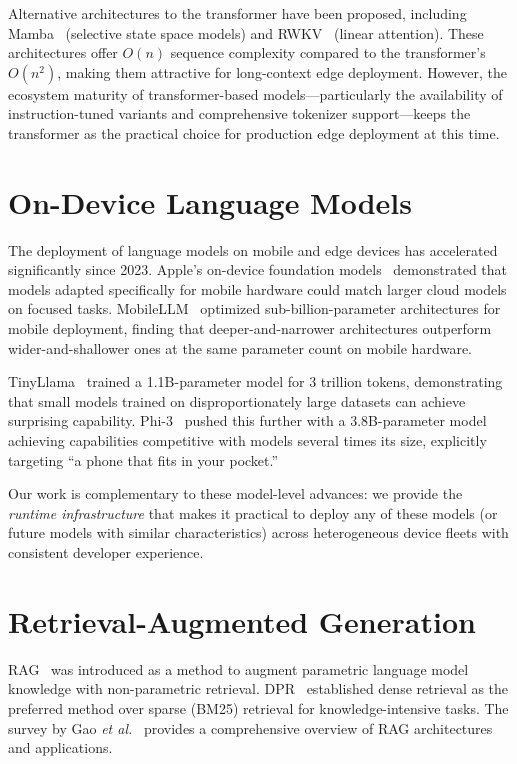 \documentclass[12pt, letterpaper, twoside]{report}
\newcommand{\etal}{\textit{et al.}\xspace}
\begin{document}
Alternative architectures to the transformer have been proposed, including Mamba~\cite{gu2023mamba} (selective state space models) and RWKV~\cite{peng2023rwkv} (linear attention). These architectures offer $O(n)$ sequence complexity compared to the transformer's $O(n^2)$, making them attractive for long-context edge deployment. However, the ecosystem maturity of transformer-based models---particularly the availability of instruction-tuned variants and comprehensive tokenizer support---keeps the transformer as the practical choice for production edge deployment at this time.

\section{On-Device Language Models}
\label{sec:related_ondevice}

The deployment of language models on mobile and edge devices has accelerated significantly since 2023. Apple's on-device foundation models~\cite{gunter2024apple} demonstrated that models adapted specifically for mobile hardware could match larger cloud models on focused tasks. MobileLLM~\cite{liu2024mobilellm} optimized sub-billion-parameter architectures for mobile deployment, finding that deeper-and-narrower architectures outperform wider-and-shallower ones at the same parameter count on mobile hardware.

TinyLlama~\cite{zhang2024tinyllama} trained a 1.1B-parameter model for 3 trillion tokens, demonstrating that small models trained on disproportionately large datasets can achieve surprising capability. Phi-3~\cite{abdin2024phi3} pushed this further with a 3.8B-parameter model achieving capabilities competitive with models several times its size, explicitly targeting ``a phone that fits in your pocket.''

Our work is complementary to these model-level advances: we provide the \textit{runtime infrastructure} that makes it practical to deploy any of these models (or future models with similar characteristics) across heterogeneous device fleets with consistent developer experience.

\section{Retrieval-Augmented Generation}
\label{sec:related_rag}

RAG~\cite{lewis2020retrieval} was introduced as a method to augment parametric language model knowledge with non-parametric retrieval. DPR~\cite{karpukhin2020dense} established dense retrieval as the preferred method over sparse (BM25) retrieval for knowledge-intensive tasks. The survey by Gao \etal~\cite{gao2023retrieval} provides a comprehensive overview of RAG architectures and applications.
\end{document}
